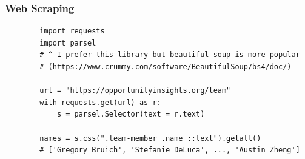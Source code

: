 \documentclass{ali-presentation}
\begin{document}
\begin{frame}[fragile]
    \frametitle{Web Scraping}

    \begin{verbatim}
        import requests
        import parsel
        # ^ I prefer this library but beautiful soup is more popular
        # (https://www.crummy.com/software/BeautifulSoup/bs4/doc/)

        url = "https://opportunityinsights.org/team"
        with requests.get(url) as r:
            s = parsel.Selector(text = r.text)

        names = s.css(".team-member .name ::text").getall()
        # ['Gregory Bruich', 'Stefanie DeLuca', ..., 'Austin Zheng']
    \end{verbatim}
\end{frame}
\end{document}
